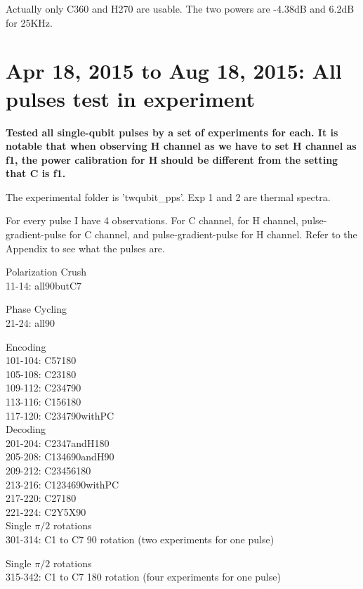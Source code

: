 Actually only C360 and H270 are usable. The two powers are -4.38dB and 6.2dB for 25KHz.

\clearpage
\section{Apr 18, 2015 to Aug 18, 2015: All pulses test in experiment}

{}

\textbf{Tested all single-qubit pulses by a set of experiments for each. It is notable that when observing H channel as we have to set H channel as f1, the power calibration for H should be different from the setting that C is f1.}

The experimental folder is 'twqubit\_pps'. Exp 1 and 2 are thermal spectra.

For every pulse I have 4 observations. For C channel, for H channel, pulse-gradient-pulse for C channel, and pulse-gradient-pulse for H channel. Refer to the Appendix to see what the pulses are.

Polarization Crush \\
11-14: all90butC7

Phase Cycling \\
21-24: all90

Encoding \\
101-104: C57180 \\
105-108: C23180 \\
109-112: C234790 \\
113-116: C156180 \\
117-120: C234790withPC \\

Decoding \\
201-204: C2347andH180 \\
205-208: C134690andH90 \\
209-212: C23456180 \\
213-216: C1234690withPC \\
217-220: C27180 \\
221-224: C2Y5X90 \\

Single $\pi/2$ rotations \\
301-314: C1 to C7 90 rotation (two experiments for one pulse)

Single $\pi/2$ rotations \\
315-342: C1 to C7 180 rotation (four experiments for one pulse)

{}

